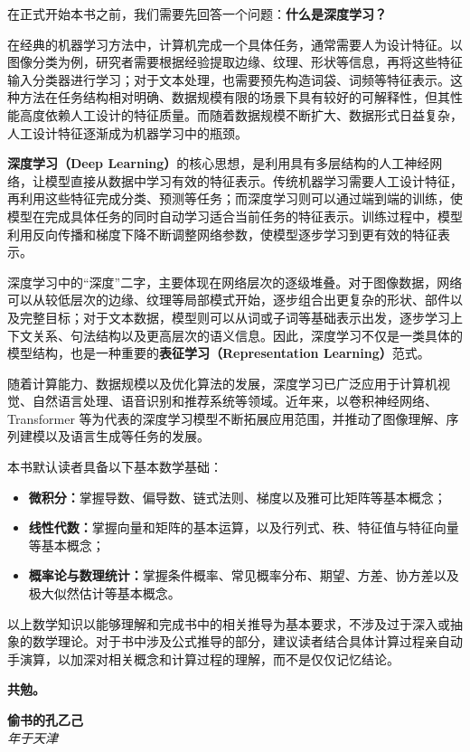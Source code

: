 

在正式开始本书之前，我们需要先回答一个问题：\textbf{什么是深度学习？}

在经典的机器学习方法中，计算机完成一个具体任务，通常需要人为设计特征。以图像分类为例，研究者需要根据经验提取边缘、纹理、形状等信息，再将这些特征输入分类器进行学习；对于文本处理，也需要预先构造词袋、词频等特征表示。这种方法在任务结构相对明确、数据规模有限的场景下具有较好的可解释性，但其性能高度依赖人工设计的特征质量。而随着数据规模不断扩大、数据形式日益复杂，人工设计特征逐渐成为机器学习中的瓶颈。

\textbf{深度学习（Deep Learning）}的核心思想，是利用具有多层结构的人工神经网络，让模型直接从数据中学习有效的特征表示。传统机器学习需要人工设计特征，再利用这些特征完成分类、预测等任务；而深度学习则可以通过端到端的训练，使模型在完成具体任务的同时自动学习适合当前任务的特征表示。训练过程中，模型利用反向传播和梯度下降不断调整网络参数，使模型逐步学习到更有效的特征表示。

深度学习中的“深度”二字，主要体现在网络层次的逐级堆叠。对于图像数据，网络可以从较低层次的边缘、纹理等局部模式开始，逐步组合出更复杂的形状、部件以及完整目标；对于文本数据，模型则可以从词或子词等基础表示出发，逐步学习上下文关系、句法结构以及更高层次的语义信息。因此，深度学习不仅是一类具体的模型结构，也是一种重要的\textbf{表征学习（Representation Learning）}范式。

随着计算能力、数据规模以及优化算法的发展，深度学习已广泛应用于计算机视觉、自然语言处理、语音识别和推荐系统等领域。近年来，以卷积神经网络、Transformer 等为代表的深度学习模型不断拓展应用范围，并推动了图像理解、序列建模以及语言生成等任务的发展。

本书默认读者具备以下基本数学基础：
\begin{itemize}
    \item \textbf{微积分：}掌握导数、偏导数、链式法则、梯度以及雅可比矩阵等基本概念；
    \item \textbf{线性代数：}掌握向量和矩阵的基本运算，以及行列式、秩、特征值与特征向量等基本概念；
    \item \textbf{概率论与数理统计：}掌握条件概率、常见概率分布、期望、方差、协方差以及极大似然估计等基本概念。
\end{itemize}

以上数学知识以能够理解和完成书中的相关推导为基本要求，不涉及过于深入或抽象的数学理论。对于书中涉及公式推导的部分，建议读者结合具体计算过程亲自动手演算，以加深对相关概念和计算过程的理解，而不是仅仅记忆结论。

\textbf{共勉。}

\vspace{1cm}
\begin{flushright}
\textbf{偷书的孔乙己} \\
\textit{\the\year 年于天津}
\end{flushright}

\cleardoublepage

